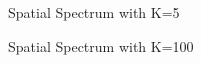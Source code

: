 \documentclass[conference]{IEEEtran}
\begin{document}
		\begin{figure}[H]
			\centerline{}
			\caption{Spatial Spectrum with K=5}
		\end{figure}
		
		\begin{figure}[H]
			\centerline{}
			\caption{Spatial Spectrum with K=100}
		\end{figure}
		
\end{document}

